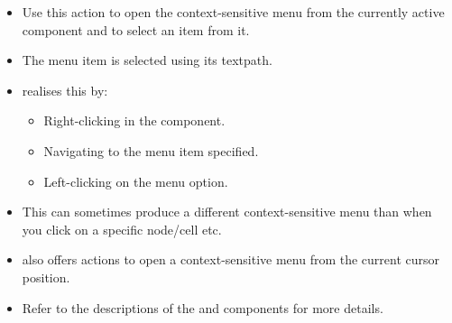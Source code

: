 \begin{itemize}
\item Use this action to open the context-sensitive menu from the currently active component and to select an item from it.
\item The menu item is selected using its textpath. 
\item \gd{} realises this by:
\begin{itemize}
\item Right-clicking in the component.
\item Navigating to the menu item specified.
\item Left-clicking on the menu option.  
\end{itemize}
\item This can sometimes produce a different context-sensitive menu than when you click on a specific node/cell etc.
 \item \gd{} also offers actions to open a context-sensitive menu from the current cursor position. 
\item Refer to the descriptions of the  and  components for more details. 

\end{itemize}

  

  